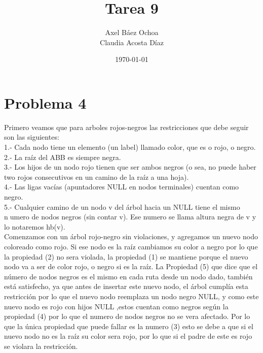 \documentclass[12pt,letterpaper]{article}
\title{ \textbf{Tarea 9}}
\author{Axel Báez Ochoa\\
Claudia Acosta Díaz}
\date{\today}
\begin{document}
\maketitle
\section{Problema 4}
    Primero veamos que para arboles rojos-negros las restricciones que debe seguir son las siguientes:\\
    
    1.- Cada nodo tiene un elemento (un label) llamado color, que es o rojo, o negro.\\
    
    2.- La raíz del ABB es siempre negra.\\
    
    3.- Los hijos de un nodo rojo tienen que ser ambos negros (o sea, no puede haber two rojos consecutivos en un camino de la raíz a una hoja).\\
    
    4.- Las ligas vacías (apuntadores NULL en nodos terminales) cuentan como negro.\\
    
    5.- Cualquier camino de un nodo v del árbol hacia un NULL tiene el mismo numero de nodos negros (sin contar v). Ese numero se llama altura negra de v y lo notaremos hb(v).\\

    
    Comenzamos con un árbol rojo-negro sin violaciones, y agregamos un nuevo nodo coloreado como rojo. Si ese nodo es la raíz cambiamos su color a negro por lo que la propiedad (2) no sera violada, la propiedad (1) se mantiene porque el nuevo nodo va a ser de color rojo, o negro si es la raíz. La Propiedad (5) que dice que el número de nodos negros es el mismo en cada ruta  desde un nodo dado, también está satisfecho, ya que antes de insertar este nuevo nodo, el árbol cumplía esta restricción por lo que el nuevo nodo  reemplaza un nodo negro NULL, y como este nuevo nodo  es rojo con hijos NULL ,estos cuentan como negros según la propiedad (4) por lo que el numero de nodos negros no se vera afectado. Por lo que la única propiedad que puede fallar es la numero (3) esto se debe a que si el nuevo nodo no es la raíz su color sera rojo, por lo que si el padre de este es rojo se violara la restricción.
\end{document}
